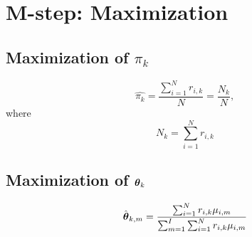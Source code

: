 \documentclass[12pt]{article}
\begin{document}
\section{M-step: Maximization}

\subsection{Maximization of $\pi_k$}


\begin{equation}
	\hat{\pi_k} = \frac{\sum_{i=1}^N r_{i,k}}{N} = \frac{N_k}{N},
\end{equation}
where
\begin{equation}
	N_k = \sum_{i=1}^N r_{i,k}
\end{equation}

\subsection{Maximization of $\boldsymbol\theta_k$}

\begin{equation}
	\hat{\boldsymbol\theta}_{k,m} = \frac{\sum_{i=1}^N r_{i,k}\mu_{i,m}}{\sum_{m=1}^I \sum_{i=1}^N r_{i,k} \mu_{i,m}}
\end{equation}
\end{document}
